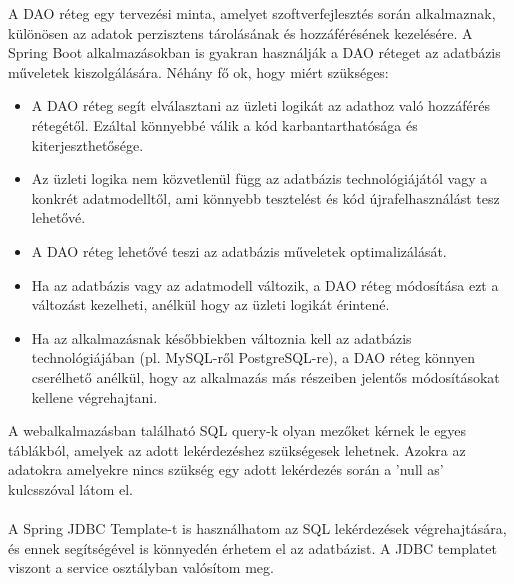 
A DAO\cite{DAO} réteg egy tervezési minta, amelyet szoftverfejlesztés során alkalmaznak, különösen az adatok perzisztens tárolásának és hozzáférésének kezelésére. A Spring Boot\cite{spring_boot} alkalmazásokban is gyakran használják a DAO\cite{DAO} réteget az adatbázis műveletek kiszolgálására. Néhány fő ok, hogy miért szükséges:

\begin{itemize}

\item{} A DAO\cite{DAO} réteg segít elválasztani az üzleti logikát az adathoz való hozzáférés rétegétől. Ezáltal könnyebbé válik a kód karbantarthatósága és kiterjeszthetősége. 

\item{} Az üzleti logika nem közvetlenül függ az adatbázis technológiájától vagy a konkrét adatmodelltől, ami könnyebb tesztelést és kód újrafelhasználást tesz lehetővé. 

\item{} A DAO\cite{DAO} réteg lehetővé teszi az adatbázis műveletek optimalizálását. 

\item{} Ha az adatbázis vagy az adatmodell változik, a DAO\cite{DAO} réteg módosítása ezt a változást kezelheti, anélkül hogy az üzleti logikát érintené. 

\item{} Ha az alkalmazásnak későbbiekben változnia kell az adatbázis technológiájában (pl. MySQL-ről PostgreSQL-re), a DAO\cite{DAO} réteg könnyen cserélhető anélkül, hogy az alkalmazás más részeiben jelentős módosításokat kellene végrehajtani.

\end{itemize}

A webalkalmazásban található SQL query-k olyan mezőket kérnek le egyes táblákból, amelyek az adott lekérdezéshez szükségesek lehetnek. Azokra az adatokra amelyekre nincs szükség egy adott lekérdezés során a 'null as' kulcsszóval látom el.\\
\\
A Spring JDBC Template-t\cite{JdbcTemplate} is használhatom az SQL lekérdezések végrehajtására, és ennek segítségével is könnyedén érhetem el az adatbázist. A JDBC templatet viszont a service osztályban valósítom meg.




